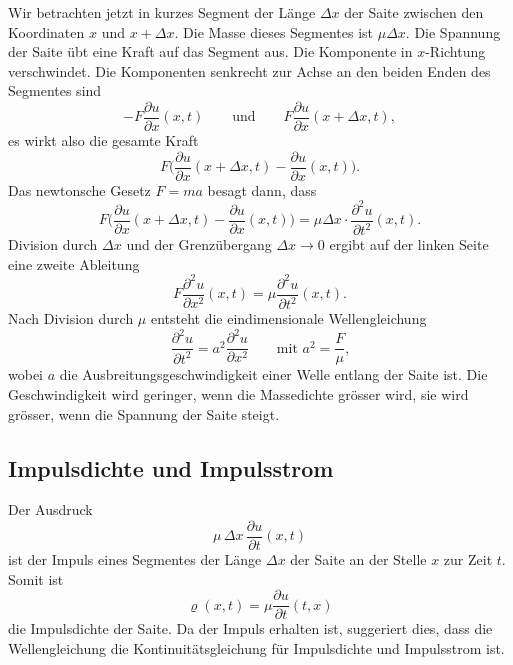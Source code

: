 Wir betrachten jetzt in kurzes Segment der Länge $\Delta x$ der Saite
zwischen den Koordinaten $x$ und $x+\Delta x$.
Die Masse dieses Segmentes ist $\mu \Delta x$.
Die Spannung der Saite übt eine Kraft auf das Segment aus.
Die Komponente in $x$-Richtung verschwindet.
Die Komponenten senkrecht zur Achse an den beiden 
Enden des Segmentes sind
\[
-F\frac{\partial u}{\partial x}(x,t)
\qquad\text{und}\qquad
F\frac{\partial u}{\partial x}(x+\Delta x,t),
\]
es wirkt also die gesamte Kraft
\[
F
\biggl(
\frac{\partial u}{\partial x}(x+\Delta x,t)
-
\frac{\partial u}{\partial x}(x,t)
\biggr).
\]
Das newtonsche Gesetz $F=ma$ besagt dann, dass
\[
F
\biggl(
\frac{\partial u}{\partial x}(x+\Delta x,t)
-
\frac{\partial u}{\partial x}(x,t)
\biggr)
=
\mu\Delta x\cdot \frac{\partial^2 u}{\partial t^2}(x,t).
\]
Division durch $\Delta x$ und der Grenzübergang $\Delta x\to 0$ ergibt
auf der linken Seite eine zweite Ableitung
\[
F
\frac{\partial^2u}{\partial x^2}(x,t)
=
\mu
\frac{\partial^2u}{\partial t^2}(x,t).
\]
Nach Division durch $\mu$ entsteht die eindimensionale Wellengleichung
\begin{equation}
\frac{\partial^2 u}{\partial t^2}
=
a^2
\frac{\partial^2 u}{\partial x^2}
\qquad\text{mit $a^2=\displaystyle\frac{F}{\mu}$,}
\end{equation}
wobei $a$ die Ausbreitungsgeschwindigkeit einer Welle entlang der
Saite ist.
Die Geschwindigkeit wird geringer, wenn die Massedichte grösser wird,
sie wird grösser, wenn die Spannung der Saite steigt.

%
%
\subsection{Impulsdichte und Impulsstrom}
Der Ausdruck
\[
\mu \,\Delta x \,\frac{\partial u}{\partial t}(x,t)
\]
ist der Impuls eines Segmentes der Länge $\Delta x$ der Saite
an der Stelle $x$ zur Zeit $t$.
Somit ist
\[
\varrho(x,t)
=
\mu\frac{\partial u}{\partial t}(t,x)
\]
die Impulsdichte der Saite.
Da der Impuls erhalten ist, suggeriert dies, dass die Wellengleichung
die Kontinuitätsgleichung für Impulsdichte und Impulsstrom ist.

